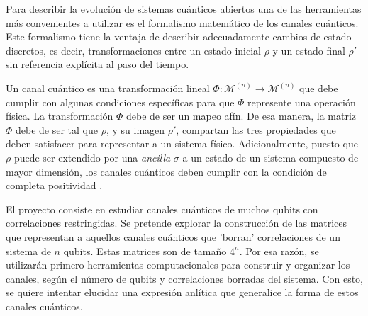 \documentclass[11pt, spanish, letterpage]{article}
\begin{document}
Para describir la evolución de sistemas cuánticos abiertos una de las herramientas más convenientes a utilizar es el formalismo matemático de los canales cuánticos. Este formalismo tiene la ventaja de describir adecuadamente cambios de estado discretos, es decir, transformaciones entre un estado inicial $\rho$ y un estado final $\rho '$ sin referencia explícita al paso del tiempo. 

Un canal cuántico es una transformación lineal $\Phi : \mathcal{M}^{(n)} \to \mathcal{M}^{(n)}$ que debe cumplir con algunas condiciones específicas para que $\Phi$ represente una operación física. La transformación $\Phi$ debe de ser un mapeo afín. De esa manera, la matriz $\Phi$ debe de ser tal que $\rho$, y su imagen $\rho '$, compartan las tres propiedades que deben satisfacer para representar a un sistema físico. Adicionalmente, puesto que $\rho$ puede ser extendido por una \textit{ancilla} $\sigma$ a un estado de un sistema compuesto de mayor dimensión, los canales cuánticos deben cumplir con la condición de completa positividad \cite{bengtsson_zyczkowski_2017}. 


El proyecto consiste en estudiar canales cuánticos de muchos qubits con correlaciones restringidas. Se pretende explorar la construcción de las matrices que representan a aquellos canales cuánticos que 'borran' correlaciones de un sistema de $n$ qubits. Estas matrices son de tamaño $4^n$. Por esa razón, se utilizarán primero herramientas computacionales para construir y organizar los canales, según el número de qubits y correlaciones borradas del sistema. Con esto, se quiere intentar elucidar una expresión anlítica que generalice la forma de estos canales cuánticos.  
\end{document}
